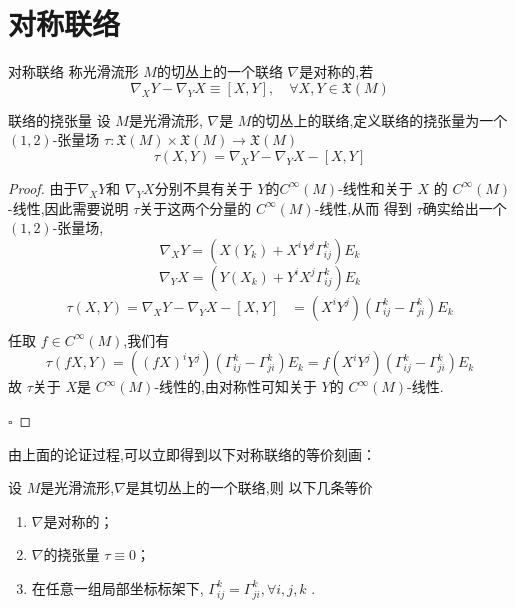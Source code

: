 \documentclass[../../几何与拓扑.tex]{subfiles}
\begin{document}
\section{对称联络}  

\begin{definition}{对称联络}
    称光滑流形 \(  M  \)的切丛上的一个联络 \(   \nabla   \)是对称的,若 \[
     \nabla _{X}Y- \nabla _{Y}X \equiv \left[ X,Y \right],\quad \forall X,Y \in \mathfrak{X}\left( M \right)  
    \] 
\end{definition}

\begin{definition}{联络的挠张量}
    设 \(  M  \)是光滑流形, \(   \nabla   \)是 \(  M  \)的切丛上的联络,定义联络的挠张量为一个  \(  \left( 1,2 \right)   \)-张量场 \(  \tau : \mathfrak{X}\left( M \right)\times \mathfrak{X}\left( M \right)\to \mathfrak{X}\left( M \right)     \) \[
    \tau \left( X,Y \right)=   \nabla _{X}Y- \nabla _{Y}X-\left[ X,Y \right]  
    \]     
\end{definition}
\begin{proof}
   由于\(   \nabla _{X}Y  \)和 \(   \nabla _{Y}X  \)分别不具有关于 \( Y \)的\(  C^{\infty}\left( M \right)   \)-线性和关于 \(  X  \)  的 \(  C^{\infty}\left( M \right)   \)-线性,因此需要说明 \(  \tau   \)关于这两个分量的 \(  C^{\infty}\left( M \right)   \)-线性,从而      得到 \(  \tau   \)确实给出一个 \(  \left( 1,2 \right)   \)-张量场,  
    \[
        \nabla _{X}Y=  \left( X\left( Y_{k} \right)+ X^{i}Y^{j} \Gamma _{ij}^{k}  \right)E_{k} 
       \] \[
        \nabla _{Y}X =  \left( Y\left( X_{k} \right)+ Y^{i}X^{j} \Gamma _{ij}^{k}  \right)E_{k} 
       \]  \[
       \begin{aligned}
     \tau \left( X,Y \right)=     \nabla _{X}Y- \nabla _{Y}X-\left[ X,Y \right]& = \left( X^{i}Y^{j} \right)\left(  \Gamma _{ij}^{k}- \Gamma _{ji}^{k} \right)E_{k}  \\ 
       \end{aligned} 
       \]任取 \(  f \in C^{\infty}\left( M \right)   \),我们有 \[
       \tau \left( fX,Y \right) =  \left( \left( fX \right)^{i}Y^{j}  \right)\left(  \Gamma _{ij}^{k}- \Gamma _{ji}^{k} \right)E_{k}    =  f\left( X^{i}Y^{j} \right)\left(  \Gamma _{ij}^{k}- \Gamma _{ji}^{k} \right)E_{k}  
       \] 故 \(  \tau   \)关于 \(  X  \)是 \(  C^{\infty}\left( M \right)   \)-线性的,由对称性可知关于 \(  Y  \)的 \(  C^{\infty}\left( M \right)   \)-线性.   

    \hfill $\square$
\end{proof}
由上面的论证过程,可以立即得到以下对称联络的等价刻画：
\begin{proposition}
    设 \(  M  \)是光滑流形,\(   \nabla   \)是其切丛上的一个联络,则  以下几条等价
    \begin{enumerate}
        \item \(   \nabla   \)是对称的；
        \item  \(   \nabla   \)的挠张量 \(  \tau\equiv 0   \)；
        \item 在任意一组局部坐标标架下, \(   \Gamma _{ij}^{k}=  \Gamma _{ji}^{k},\forall i,j,k  \) .
    \end{enumerate}
    

\end{proposition}
\end{document}
